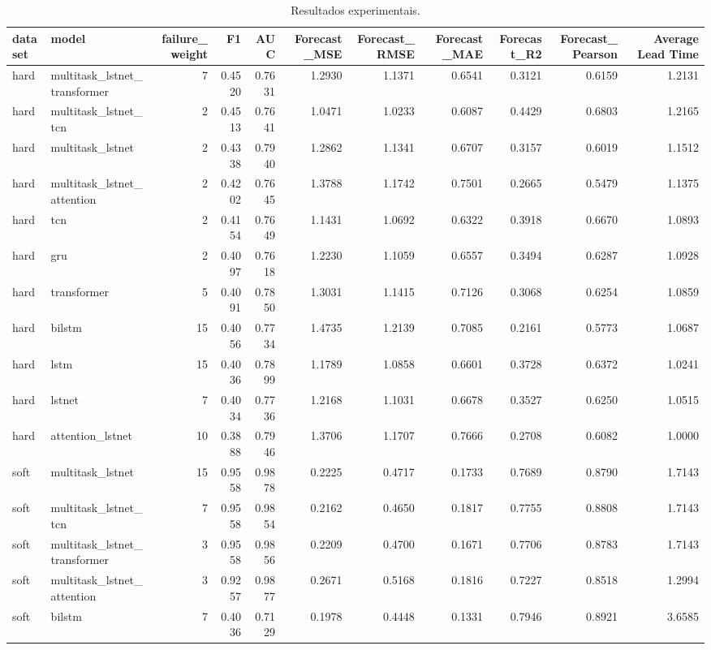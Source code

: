 \begin{table}
\caption{Resultados experimentais.}
\label{tab:results}
\begin{tabular}{llrrrrrrrrr}
\toprule
dataset & model & failure_weight & F1 & AUC & Forecast_MSE & Forecast_RMSE & Forecast_MAE & Forecast_R2 & Forecast_Pearson & Average Lead Time \\
\midrule
hard & multitask_lstnet_transformer & 7 & 0.4520 & 0.7631 & 1.2930 & 1.1371 & 0.6541 & 0.3121 & 0.6159 & 1.2131 \\
hard & multitask_lstnet_tcn & 2 & 0.4513 & 0.7641 & 1.0471 & 1.0233 & 0.6087 & 0.4429 & 0.6803 & 1.2165 \\
hard & multitask_lstnet & 2 & 0.4338 & 0.7940 & 1.2862 & 1.1341 & 0.6707 & 0.3157 & 0.6019 & 1.1512 \\
hard & multitask_lstnet_attention & 2 & 0.4202 & 0.7645 & 1.3788 & 1.1742 & 0.7501 & 0.2665 & 0.5479 & 1.1375 \\
hard & tcn & 2 & 0.4154 & 0.7649 & 1.1431 & 1.0692 & 0.6322 & 0.3918 & 0.6670 & 1.0893 \\
hard & gru & 2 & 0.4097 & 0.7618 & 1.2230 & 1.1059 & 0.6557 & 0.3494 & 0.6287 & 1.0928 \\
hard & transformer & 5 & 0.4091 & 0.7850 & 1.3031 & 1.1415 & 0.7126 & 0.3068 & 0.6254 & 1.0859 \\
hard & bilstm & 15 & 0.4056 & 0.7734 & 1.4735 & 1.2139 & 0.7085 & 0.2161 & 0.5773 & 1.0687 \\
hard & lstm & 15 & 0.4036 & 0.7899 & 1.1789 & 1.0858 & 0.6601 & 0.3728 & 0.6372 & 1.0241 \\
hard & lstnet & 7 & 0.4034 & 0.7736 & 1.2168 & 1.1031 & 0.6678 & 0.3527 & 0.6250 & 1.0515 \\
hard & attention_lstnet & 10 & 0.3888 & 0.7946 & 1.3706 & 1.1707 & 0.7666 & 0.2708 & 0.6082 & 1.0000 \\
soft & multitask_lstnet & 15 & 0.9558 & 0.9878 & 0.2225 & 0.4717 & 0.1733 & 0.7689 & 0.8790 & 1.7143 \\
soft & multitask_lstnet_tcn & 7 & 0.9558 & 0.9854 & 0.2162 & 0.4650 & 0.1817 & 0.7755 & 0.8808 & 1.7143 \\
soft & multitask_lstnet_transformer & 3 & 0.9558 & 0.9856 & 0.2209 & 0.4700 & 0.1671 & 0.7706 & 0.8783 & 1.7143 \\
soft & multitask_lstnet_attention & 3 & 0.9257 & 0.9877 & 0.2671 & 0.5168 & 0.1816 & 0.7227 & 0.8518 & 1.2994 \\
soft & bilstm & 7 & 0.4036 & 0.7129 & 0.1978 & 0.4448 & 0.1331 & 0.7946 & 0.8921 & 3.6585 \\

\end{tabular}
\end{table}
